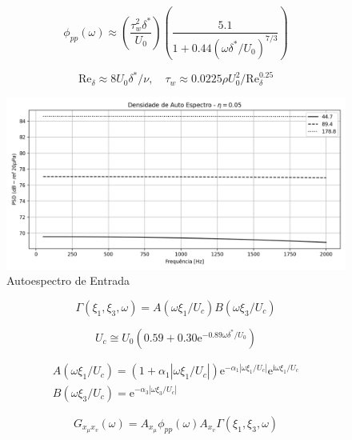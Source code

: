 \documentclass[9pt,a4paper,twoside]{rho-class/rho}
\begin{document}
\begin{equation}
	\phi_{pp}(\omega)\approx\left(\frac{\tau_w^2\delta^*}{U_0}\right)\left(\frac{5.1}{1+0.44(\omega\delta^*/U_0)^{7/3}}\right)
\end{equation}

\begin{equation}
	\mathrm{Re}_\delta\approx8U_0\delta^*/\nu, \quad \tau_w\approx0.0225\rho U_0^2/\mathrm{Re}_\delta^{0.25}
\end{equation}

\begin{figure}[H]
	\centering
	\includegraphics[width=0.9\columnwidth]{figures/psd_vel.png}
	\caption{Autoespectro de Entrada}
	\label{fig:psd}
\end{figure}

\begin{equation}
	\Gamma(\xi_1,\xi_3,\omega)=A(\omega\xi_1/U_c)B(\omega\xi_3/U_c)
\end{equation}

\begin{equation}
	U_c\cong U_0(0.59+0.30\mathrm{e}^{-0.89\omega\delta^*/U_0})
\end{equation}

\begin{eqnarray}
	A(\omega\xi_1/U_c)=(1+\alpha_1|\omega\xi_1/U_c|)\mathrm{e}^{-\alpha_1|\omega\xi_1/U_c|}\mathrm{e}^{\mathrm{i}\omega\xi_1/U_c} \\
	B(\omega\xi_3/U_c)=\mathrm{e}^{-\alpha_3|\omega\xi_3/U_c|}
\end{eqnarray}


\begin{equation}
	G_{x_\mu x_v}(\omega)=A_{x_\mu}\phi_{pp}(\omega)A_{x_v}\Gamma(\xi_1,\xi_3,\omega)
\end{equation}
\end{document}
